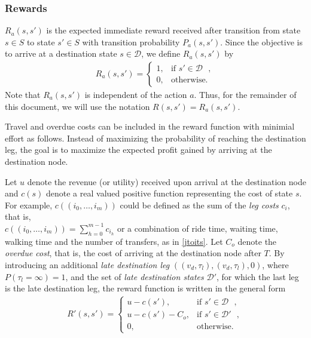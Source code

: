\documentclass[dissertation,draft*]{aaltoseries}
\begin{document}
\subsubsection{Rewards}
\label{rewardsdef}
$R_a(s,s')$ is the expected immediate reward received after transition from state $s \in S$ to state $s' \in S$ 
with transition probability $P_a(s,s')$. 
Since the objective is to arrive at a destination state $s \in \mathcal{D}$, we define $R_a(s,s')$ by
\begin{align}
\label{rewards}
 R_a(s,s')= 
\left\{
\begin{array}{ll}
1, &  \mbox{if $s' \in \mathcal{D}$ },\\ 
0, & \mbox{otherwise.}
\end{array}
\right.
\end{align}
Note that $R_a(s,s')$ is independent of the action $a$. Thus, for the remainder of this document, we will use
the notation $R(s,s') = R_a(s,s')$.

Travel and overdue costs can be included in the reward function with minimial effort as follows.
Instead of maximizing the probability of reaching the destination leg, the goal is to 
maximize the expected profit gained by arriving at the destination node.

Let $u$ denote the revenue (or utility) received upon arrival at the destination node and $c(s)$ 
denote a real valued positive function representing the cost of state $s$. 
For example, $c((i_0,\ldots,i_m))$ could be defined as the sum of the \emph{leg costs} $c_{i}$,
that is, \\ ${c((i_0,\ldots,i_m))= \sum_{h=0}^{m-1} c_{i_h}}$ or a combination of ride time, waiting time, walking time and the 
number of transfers, as in \ref{jtoits}. 
Let $C_o$ denote the \emph{overdue cost}, 
that is, the cost of arriving at the destination node after $T$. By introducing an
additional \emph{late destination leg} $((v_{d},\tau_{l}),(v_{d},\tau_{l}),0)$, where $P(\tau_l=\infty)=1$,
and the set of \emph{late destination states} $\mathcal{D}'$, for which the last leg is the late destination leg,
the reward function is written in the general form
\begin{align}
\label{rewards2}
 R'(s,s')= 
\left\{
\begin{array}{ll}
u - c(s'), &  \mbox{if $s' \in \mathcal{D}$ },\\ 
u - c(s') - C_o, &  \mbox{if $s' \in \mathcal{D}'$ },\\ 
0, & \mbox{otherwise.}
\end{array}
\right.
\end{align}
\end{document}
